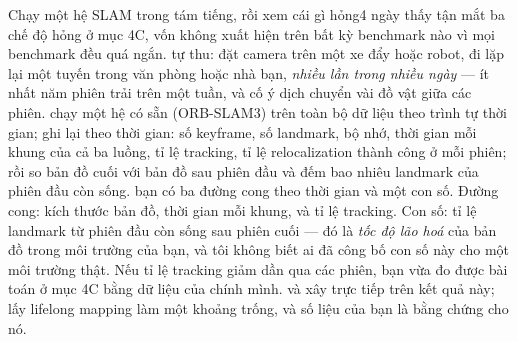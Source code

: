 \documentclass[../../vslam.tex]{subfiles}
\begin{document}
\begin{ungdung}
\end{ungdung}

\begin{duan}{Chạy một hệ SLAM trong tám tiếng, rồi xem cái gì hỏng}{4 ngày}
\dmt thấy tận mắt ba chế độ hỏng ở mục 4C, vốn không xuất hiện trên bất kỳ benchmark nào vì mọi benchmark đều quá ngắn.
\ddl tự thu: đặt camera trên một xe đẩy hoặc robot, đi lặp lại một tuyến trong văn phòng hoặc nhà bạn, \emph{nhiều lần trong nhiều ngày} --- ít nhất năm phiên trải trên một tuần, và cố ý dịch chuyển vài đồ vật giữa các phiên.
\dbc chạy một hệ có sẵn (ORB-SLAM3) trên toàn bộ dữ liệu theo trình tự thời gian; ghi lại theo thời gian: số keyframe, số landmark, bộ nhớ, thời gian mỗi khung của cả ba luồng, tỉ lệ tracking, tỉ lệ relocalization thành công ở mỗi phiên; rồi so bản đồ cuối với bản đồ sau phiên đầu và đếm bao nhiêu landmark của phiên đầu còn sống.
\dxk bạn có ba đường cong theo thời gian và một con số. Đường cong: kích thước bản đồ, thời gian mỗi khung, và tỉ lệ tracking. Con số: tỉ lệ landmark từ phiên đầu còn sống sau phiên cuối --- đó là \emph{tốc độ lão hoá} của bản đồ trong môi trường của bạn, và tôi không biết ai đã công bố con số này cho một môi trường thật. Nếu tỉ lệ tracking giảm dần qua các phiên, bạn vừa đo được bài toán ở mục 4C bằng dữ liệu của chính mình.
\dnv {} và  xây trực tiếp trên kết quả này;  lấy lifelong mapping làm một khoảng trống, và số liệu của bạn là bằng chứng cho nó.
\end{duan}
\end{document}
